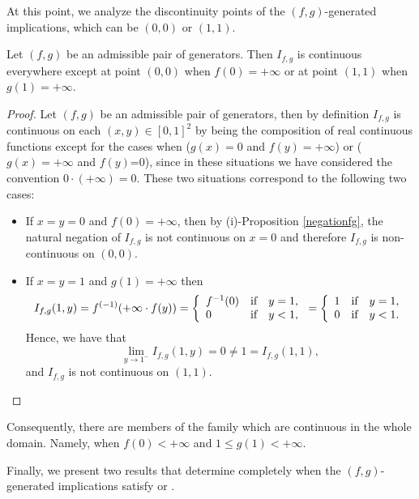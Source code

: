 At this point, we analyze the discontinuity points of the $(f,g)$-generated implications, which can be $(0,0)$ or  $(1,1)$.

\begin{proposition}\label{prop:(f,g):continuity} 
	Let $(f,g)$ be an admissible pair of generators. Then $I_{f,g}$ is continuous everywhere except  at point $(0,0)$ when $f(0)=+\infty$ or at point $(1,1)$ when $g(1)=+\infty$.
\end{proposition}
\begin{proof}
	Let $(f,g)$ be an admissible pair of generators, then by definition $I_{f,g}$ is continuous on each $(x,y) \in [0,1]^2$ by being the composition of real continuous functions except for the cases when ($g(x)=0$ and $f(y)=+\infty$) or ($g(x)=+\infty$ and $f(y)$=0), since in these situations we have considered the convention $0 \cdot (+\infty)=0$.	These two situations correspond to the following two cases:
	\begin{itemize}
		\item If $x=y=0$ and $f(0)=+\infty$, then by (i)-Proposition \ref{negationfg}, the natural negation of $I_{f,g}$ is not continuous on $x=0$ and therefore $I_{f,g}$ is non-continuous on $(0,0)$.
		\item If $x=y=1$ and $g(1)=+\infty$ then
		$$I_{f,g}(1,y)=f^{(-1)}(+ \infty \cdot f(y)) = \left\{ \begin{array}{lcc}
			f^{-1}(0) &   \hbox{if}  & y=1, \\
			0 &  \hbox{if} & y<1,
		\end{array}
		\right.
		= \left\{ \begin{array}{lcc}
			1 &   \hbox{if}  & y=1, \\
			0 &  \hbox{if} & y<1.
		\end{array}
		\right.
		$$
		Hence, we have that
		$$\lim_{y \to 1^{-}} I_{f,g}(1,y)=0 \not = 1= I_{f,g}(1,1),$$
		and $I_{f,g}$ is not continuous on $(1,1)$.
	\end{itemize}
\end{proof}


Consequently, there are members of the family which are continuous in the whole domain. Namely, when $f(0)<+\infty$ and $1 \leq g(1) < + \infty$.

Finally, we present two results that determine completely when the $(f,g)$-generated implications satisfy \EP or \LI.

\pagebreak

